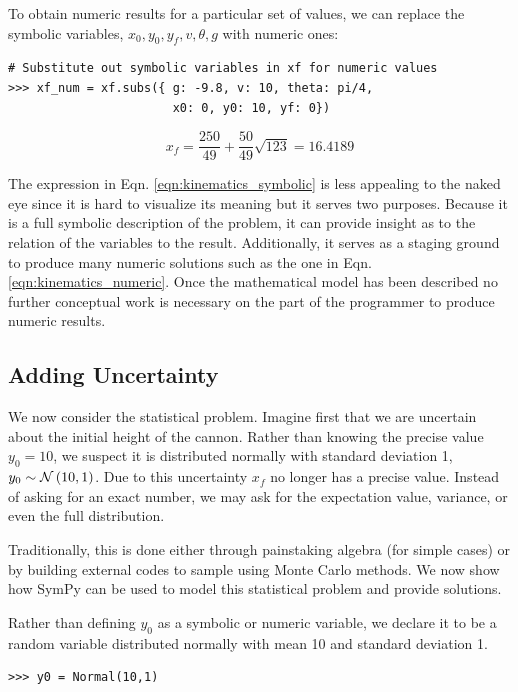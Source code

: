 To obtain numeric results for a particular set of values, we can replace the symbolic variables, $x_0, y_0, y_f, v, \theta, g$ with numeric ones:

\begin{lstlisting}
# Substitute out symbolic variables in xf for numeric values
>>> xf_num = xf.subs({ g: -9.8, v: 10, theta: pi/4, 
                       x0: 0, y0: 10, yf: 0})
\end{lstlisting}

\begin{equation}
\label{eqn:kinematics_numeric}
x_f = \frac{250}{49} + \frac{50}{49} \sqrt{123} = 16.4189
\end{equation}

The expression in Eqn. \ref{eqn:kinematics_symbolic} is less appealing to the
naked eye since it is hard to visualize its meaning but it serves two
purposes. Because it is a full symbolic description of the problem, it can
provide insight as to the relation of the variables to the
result. Additionally, it serves as a staging ground to produce many numeric
solutions such as the one in Eqn. \ref{eqn:kinematics_numeric}. Once the
mathematical model has been described no further conceptual work is necessary
on the part of the programmer to produce numeric results.

\subsection{Adding Uncertainty}

We now consider the statistical problem. Imagine first that we are uncertain
about the initial height of the cannon. Rather than knowing the precise value
$y_0 = 10$, we suspect it is distributed normally with standard deviation 1, 
$y_0 \sim \mathcal{N}\left(10, 1\right)$. Due to this uncertainty $x_f$ no longer has a precise
value. Instead of asking for an exact number, we may ask for the
expectation value, variance, or even the full distribution.

Traditionally, this is done either through painstaking algebra (for simple
cases) or by building external codes to sample using Monte Carlo methods. We
now show how SymPy can be used to model this statistical problem and provide
solutions.

Rather than defining $y_0$ as a symbolic or numeric variable, we declare
it to be a random variable distributed normally with mean 10 and standard
deviation 1.
\begin{lstlisting}
>>> y0 = Normal(10,1)
\end{lstlisting}

